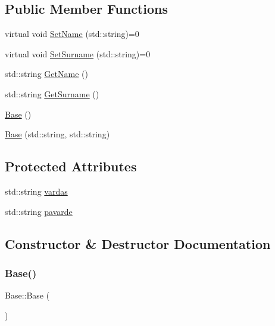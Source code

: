 \subsection*{Public Member Functions}
\begin{DoxyCompactItemize}
\item 
virtual void \mbox{\hyperlink{class_base_a36e77d06849030aa9610fedeef0cbf90}{Set\+Name}} (std\+::string)=0
\item 
virtual void \mbox{\hyperlink{class_base_aa096e05aae5778d7ebb03a8b6f775e33}{Set\+Surname}} (std\+::string)=0
\item 
std\+::string \mbox{\hyperlink{class_base_a8c1af41b4f340feded321cd6c065058e}{Get\+Name}} ()
\item 
std\+::string \mbox{\hyperlink{class_base_a96434ed4761c3394033df340df6ad066}{Get\+Surname}} ()
\item 
\mbox{\hyperlink{class_base_a5ffe0568374d8b9b4c4ec32953fd6453}{Base}} ()
\item 
\mbox{\hyperlink{class_base_addfb2253ad55343f6c063ea27ee961b5}{Base}} (std\+::string, std\+::string)
\end{DoxyCompactItemize}
\subsection*{Protected Attributes}
\begin{DoxyCompactItemize}
\item 
std\+::string \mbox{\hyperlink{class_base_a2a75481faea6ee33c342014782f239ae}{vardas}}
\item 
std\+::string \mbox{\hyperlink{class_base_a9a28bad028def844ddb5694d106e65a5}{pavarde}}
\end{DoxyCompactItemize}


\subsection{Constructor \& Destructor Documentation}
\mbox{\label{class_base_a5ffe0568374d8b9b4c4ec32953fd6453}} 
\subsubsection{\texorpdfstring{Base()}{Base()}\hspace{0.1cm}{\footnotesize\ttfamily [1/2]}}
{\footnotesize\ttfamily Base\+::\+Base (\begin{DoxyParamCaption}{ }\end{DoxyParamCaption})}

